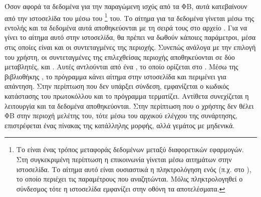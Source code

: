 \documentclass[12pt]{report}
\begin{document}
{}

Όσον αφορά τα δεδομένα για την παραγώμενη ισχύς από τα ΦΒ, αυτά κατεβαίνουν από την ιστοσελίδα του {} μέσω του {}\footnote{Το {} είναι ένας τρόπος μεταφοράς δεδομένων μεταξύ διαφορετικών
εφαρμογών. Στη συγκεκριμένη περίπτωση η επικοινωνία γίνεται μέσω αιτημάτων στην ιστοσελίδα. Το αίτημα αυτό είναι ουσιαστικά η πληκτρολόγηση ενός {} (π.χ. στο {}), το οποίο
περιέχει τις παραμέτρους που αναζητώνται. Μόλις πληκτρολογηθεί ο σύνδεσμος τότε η ιστοσελίδα εμφανίζει στην οθόνη τα αποτελέσματα.} του. Το αίτημα για τα δεδομένα γίνεται μέσω της εντολής {} 
και τα δεδομένα αυτά αποθηκεύονται με τη σειρά τους στο αρχείο {}. Για να γίνει το αίτημα αυτό στην ιστοσελίδα, θα πρέπει να δωθούν κάποιες παράμετροι, μέσα στις οποίες είναι και οι συντεταγμένες της 
περιοχής. Συνεπώς ανάλογα με την επιλογή του χρήστη, οι συντεταγμένες της επιλεχθείσας περιοχής αποθηκεύονται σε δύο μεταβλητές, {} και {}. Αυτές αντλούνται από ένα {}, το οποίο
ορίζεται στο {}. Μέσω της βιβλιοθήκης {}, το πρόγραμμα κάνει αίτημα στην ιστοσελίδα και περιμένει για απάντηση. Στην περίπτωση που δεν υπάρξει σύνδεση, εμφανίζεται ο κωδικός κατάστασης του 
πρωτοκόλλου {} και το πρόγραμμα τερματίζει. Αντίθετα συνεχίζεται η λειτουργία και τα δεδομένα αποθηκεύονται. Στην περίπτωση που ο χρήστης δεν θέλει ΦΒ στην περιοχή μελέτης του, τότε μέσω του αρχικού ελέγχου της
συνάρτησης, επιστρέφεται ένας πίνακας της κατάλληλης μορφής, αλλά γεμάτος με μηδενικά.
\end{document}
